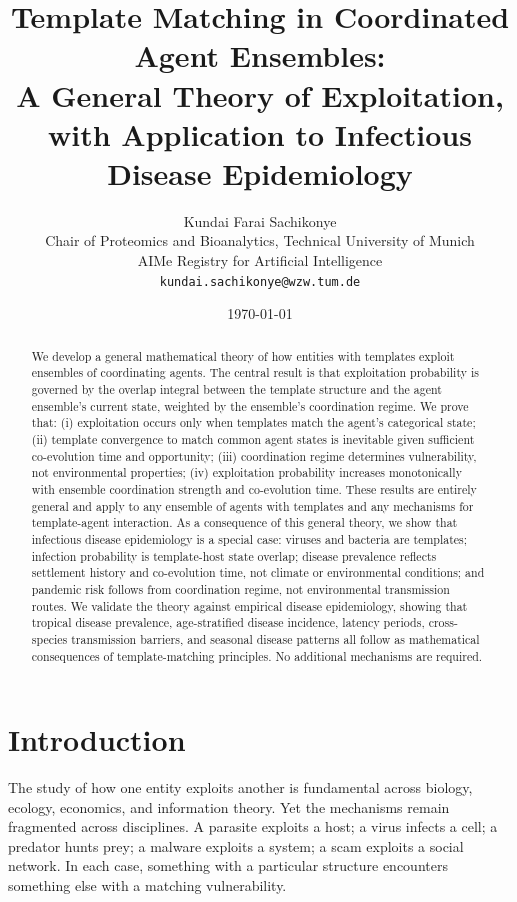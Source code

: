 \documentclass[11pt,twocolumn,a4paper]{article}
\title{\textbf{Template Matching in Coordinated Agent Ensembles:\\
A General Theory of Exploitation, with Application to Infectious Disease Epidemiology}}
\author{Kundai Farai Sachikonye\\
\small Chair of Proteomics and Bioanalytics, Technical University of Munich\\
\small AIMe Registry for Artificial Intelligence\\
\small \texttt{kundai.sachikonye@wzw.tum.de}}
\date{\today}
\begin{document}
\maketitle

\begin{abstract}
We develop a general mathematical theory of how entities with templates exploit ensembles of coordinating agents. The central result is that exploitation probability is governed by the overlap integral between the template structure and the agent ensemble's current state, weighted by the ensemble's coordination regime. We prove that: (i) exploitation occurs only when templates match the agent's categorical state; (ii) template convergence to match common agent states is inevitable given sufficient co-evolution time and opportunity; (iii) coordination regime determines vulnerability, not environmental properties; (iv) exploitation probability increases monotonically with ensemble coordination strength and co-evolution time. These results are entirely general and apply to any ensemble of agents with templates and any mechanisms for template-agent interaction. As a consequence of this general theory, we show that infectious disease epidemiology is a special case: viruses and bacteria are templates; infection probability is template-host state overlap; disease prevalence reflects settlement history and co-evolution time, not climate or environmental conditions; and pandemic risk follows from coordination regime, not environmental transmission routes. We validate the theory against empirical disease epidemiology, showing that tropical disease prevalence, age-stratified disease incidence, latency periods, cross-species transmission barriers, and seasonal disease patterns all follow as mathematical consequences of template-matching principles. No additional mechanisms are required.
\end{abstract}

\section{Introduction}
\label{sec:intro}

The study of how one entity exploits another is fundamental across biology, ecology, economics, and information theory. Yet the mechanisms remain fragmented across disciplines. A parasite exploits a host; a virus infects a cell; a predator hunts prey; a malware exploits a system; a scam exploits a social network. In each case, something with a particular structure encounters something else with a matching vulnerability.
\end{document}
